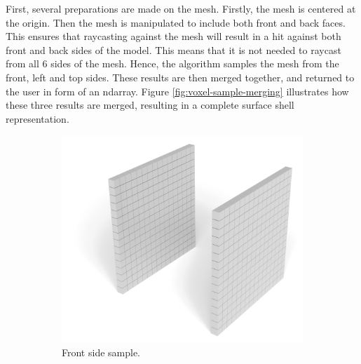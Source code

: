 First, several preparations are made on the mesh. Firstly, the mesh is centered at the origin. Then the mesh is manipulated to include both front and back faces. This ensures that raycasting against the mesh will result in a hit against both front and back sides of the model. This means that it is not needed to raycast from all 6 sides of the mesh. Hence, the algorithm samples the mesh from the front, left and top sides. These results are then merged together, and returned to the user in form of an ndarray. Figure \ref{fig:voxel-sample-merging} illustrates how these three results are merged, resulting in a complete surface shell representation.
\begin{figure}[h]
    \centering
    \begin{subfigure}[t]{0.3\textwidth}
        \centering
        \includegraphics[width=\textwidth]{sections/methodology/figures/voxels-merge-1.png}
        \caption{Front side sample.}
        \label{fig:filling-non-watertight-model}
    \end{subfigure}
    \hfill
    \begin{subfigure}[t]{0.3\textwidth}
        \centering

\end{subfigure}
\end{figure}
